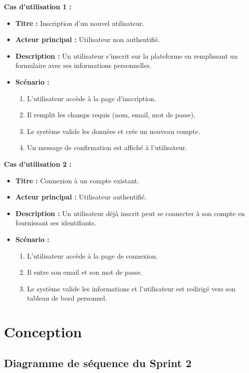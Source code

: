 \documentclass[12pt,a4paper]{report}
\begin{document}
\textbf{Cas d’utilisation 1 :}

\begin{itemize}
    \item \textbf{Titre :} Inscription d’un nouvel utilisateur.
    \item \textbf{Acteur principal :} Utilisateur non authentifié.
    \item \textbf{Description :} Un utilisateur s'inscrit sur la plateforme en remplissant un formulaire avec ses informations personnelles.
    \item \textbf{Scénario :}
    \begin{enumerate}
        \item L'utilisateur accède à la page d'inscription.
        \item Il remplit les champs requis (nom, email, mot de passe).
        \item Le système valide les données et crée un nouveau compte.
        \item Un message de confirmation est affiché à l'utilisateur.
    \end{enumerate}
\end{itemize}

\textbf{Cas d’utilisation 2 :}

\begin{itemize}
    \item \textbf{Titre :} Connexion à un compte existant.
    \item \textbf{Acteur principal :} Utilisateur authentifié.
    \item \textbf{Description :} Un utilisateur déjà inscrit peut se connecter à son compte en fournissant ses identifiants.
    \item \textbf{Scénario :}
    \begin{enumerate}
        \item L'utilisateur accède à la page de connexion.
        \item Il entre son email et son mot de passe.
        \item Le système valide les informations et l'utilisateur est redirigé vers son tableau de bord personnel.
    \end{enumerate}
\end{itemize}

\section{Conception}

\subsection{Diagramme de séquence du Sprint 2}
\end{document}

